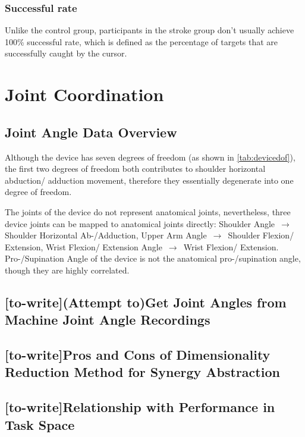 \subsubsection{Successful rate}

Unlike the control group, participants in the stroke group don't usually achieve 100\% successful rate, which is defined as the percentage of targets that are successfully caught by the cursor. 


\section{Joint Coordination}

\subsection{Joint Angle Data Overview}
Although the device has seven degrees of freedom (as shown in \ref{tab:devicedof}), the first two degrees of freedom both contributes to shoulder horizontal abduction/ adduction movement, therefore they essentially degenerate into one degree of freedom.

The joints of the device do not represent anatomical joints, nevertheless, three device joints can be mapped to anatomical joints directly: Shoulder Angle $\,\to\,$ Shoulder Horizontal Ab-/Adduction, Upper Arm Angle $\,\to\,$ Shoulder Flexion/ Extension, Wrist Flexion/ Extension Angle $\,\to\,$ Wrist Flexion/ Extension. Pro-/Supination Angle of the device is not the anatomical pro-/supination angle, though they are highly correlated.


\subsection{[to-write](Attempt to)Get Joint Angles from Machine Joint Angle Recordings }
\subsection{[to-write]Pros and Cons of Dimensionality Reduction Method for Synergy Abstraction}
\subsection{[to-write]Relationship with Performance in Task Space}
